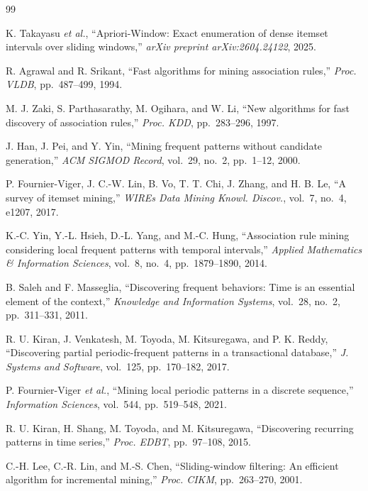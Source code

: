 \documentclass[10pt,twocolumn]{AROB}
\begin{document}
\begin{thebibliography}{99}

K. Takayasu {\it et al.},
``Apriori-Window: Exact enumeration of dense itemset intervals over sliding windows,''
{\it arXiv preprint arXiv:2604.24122}, 2025.

R. Agrawal and R. Srikant,
``Fast algorithms for mining association rules,''
{\it Proc. VLDB}, pp.~487--499, 1994.

M. J. Zaki, S. Parthasarathy, M. Ogihara, and W. Li,
``New algorithms for fast discovery of association rules,''
{\it Proc. KDD}, pp.~283--296, 1997.

J. Han, J. Pei, and Y. Yin,
``Mining frequent patterns without candidate generation,''
{\it ACM SIGMOD Record}, vol.~29, no.~2, pp.~1--12, 2000.

P. Fournier-Viger, J. C.-W. Lin, B. Vo, T. T. Chi, J. Zhang, and H. B. Le,
``A survey of itemset mining,''
{\it WIREs Data Mining Knowl. Discov.}, vol.~7, no.~4, e1207, 2017.

K.-C. Yin, Y.-L. Hsieh, D.-L. Yang, and M.-C. Hung,
``Association rule mining considering local frequent patterns with temporal intervals,''
{\it Applied Mathematics \& Information Sciences}, vol.~8, no.~4,
pp.~1879--1890, 2014.

B. Saleh and F. Masseglia,
``Discovering frequent behaviors: Time is an essential element of the context,''
{\it Knowledge and Information Systems}, vol.~28, no.~2, pp.~311--331, 2011.

R. U. Kiran, J. Venkatesh, M. Toyoda, M. Kitsuregawa, and P. K. Reddy,
``Discovering partial periodic-frequent patterns in a transactional database,''
{\it J. Systems and Software}, vol.~125, pp.~170--182, 2017.

P. Fournier-Viger {\it et al.},
``Mining local periodic patterns in a discrete sequence,''
{\it Information Sciences}, vol.~544, pp.~519--548, 2021.

R. U. Kiran, H. Shang, M. Toyoda, and M. Kitsuregawa,
``Discovering recurring patterns in time series,''
{\it Proc. EDBT}, pp.~97--108, 2015.

C.-H. Lee, C.-R. Lin, and M.-S. Chen,
``Sliding-window filtering: An efficient algorithm for incremental mining,''
{\it Proc. CIKM}, pp.~263--270, 2001.


\end{thebibliography}
\end{document}
